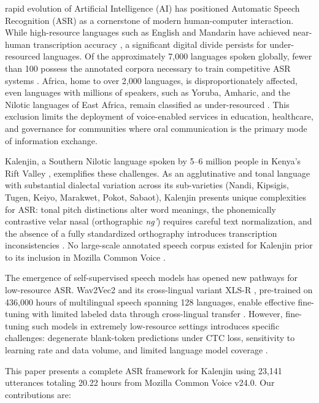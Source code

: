 \documentclass[conference]{IEEEtran}
\begin{document}
 rapid evolution of Artificial Intelligence (AI) has positioned Automatic Speech Recognition (ASR) as a cornerstone of modern human-computer interaction. While high-resource languages such as English and Mandarin have achieved near-human transcription accuracy \cite{b1, b2}, a significant digital divide persists for under-resourced languages. Of the approximately 7,000 languages spoken globally, fewer than 100 possess the annotated corpora necessary to train competitive ASR systems \cite{b3}. Africa, home to over 2,000 languages, is disproportionately affected, even languages with millions of speakers, such as Yoruba, Amharic, and the Nilotic languages of East Africa, remain classified as under-resourced \cite{b4, b5, b6}. This exclusion limits the deployment of voice-enabled services in education, healthcare, and governance for communities where oral communication is the primary mode of information exchange.

Kalenjin, a Southern Nilotic language spoken by 5--6 million people in Kenya's Rift Valley \cite{b7, b8}, exemplifies these challenges. As an agglutinative and tonal language with substantial dialectal variation across its sub-varieties (Nandi, Kipsigis, Tugen, Keiyo, Marakwet, Pokot, Sabaot), Kalenjin presents unique complexities for ASR: tonal pitch distinctions alter word meanings, the phonemically contrastive velar nasal (orthographic \textit{ng'}) requires careful text normalization, and the absence of a fully standardized orthography introduces transcription inconsistencies \cite{b9}. No large-scale annotated speech corpus existed for Kalenjin prior to its inclusion in Mozilla Common Voice \cite{b17}.

The emergence of self-supervised speech models has opened new pathways for low-resource ASR. Wav2Vec2 \cite{b1} and its cross-lingual variant XLS-R \cite{b15}, pre-trained on 436,000 hours of multilingual speech spanning 128 languages, enable effective fine-tuning with limited labeled data through cross-lingual transfer \cite{b18}. However, fine-tuning such models in extremely low-resource settings introduces specific challenges: degenerate blank-token predictions under CTC loss, sensitivity to learning rate and data volume, and limited language model coverage \cite{b6, b21}.

This paper presents a complete ASR framework for Kalenjin using 23,141 utterances totaling 20.22 hours from Mozilla Common Voice v24.0. Our contributions are:
\end{document}
